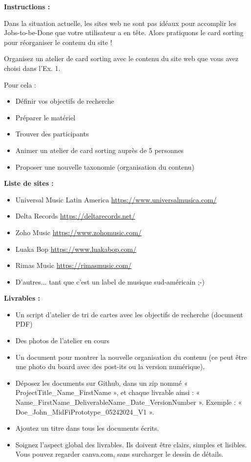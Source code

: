 \makeheaderfiles

\textbf{Instructions :}

Dans la situation actuelle, les sites web ne sont pas idéaux pour accomplir les Jobs-to-be-Done que votre utilisateur a en tête. Alors pratiquons le card sorting pour réorganiser le contenu du site !

Organisez un atelier de card sorting avec le contenu du site web que vous avez choisi dans l'Ex. 1.

Pour cela :

\begin{itemize}
\item Définir vos objectifs de recherche
\item Préparer le matériel
\item Trouver des participants
\item Animer un atelier de card sorting auprès de 5 personnes
\item Proposer une nouvelle taxonomie (organisation du contenu)
\end{itemize}

\textbf{Liste de sites :}

\begin{itemize}
\item Universal Music Latin America \url{https://www.universalmusica.com/}
\item Delta Records \url{https://deltarecords.net/}
\item Zoho Music \url{https://www.zohomusic.com/}
\item Luaka Bop \url{https://www.luakabop.com/}
\item Rimas Music \url{https://rimasmusic.com/}
\item D'autres... tant que c'est un label de musique sud-américain ;-)
\end{itemize}

\textbf{Livrables :}

\begin{itemize}
\item Un script d'atelier de tri de cartes avec les objectifs de recherche (document PDF)
\item Des photos de l'atelier en cours
\item Un document pour montrer la nouvelle organisation du contenu (ce peut être une photo du board avec des post-its ou la version numérique).
\item Déposez les documents sur Github, dans un zip nommé « ProjectTitle\_Name\_FirstName », et chaque livrable ainsi : « Name\_FirstName\_DeliverableName\_Date\_VersionNumber ». Exemple : « Doe\_John\_MidFiPrototype\_05242024\_V1 ».
\item Ajoutez un titre dans tous les documents écrits.
\item Soignez l'aspect global des livrables. Ils doivent être clairs, simples et lisibles. Vous pouvez regarder canva.com, sans surcharger le dessin de détails.
\end{itemize}

